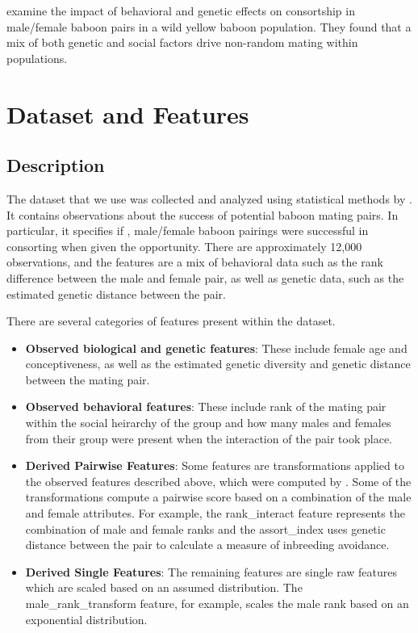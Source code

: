 \documentclass[twoside,twocolumn,paper=letter,fontsize=11pt]{article}
\begin{document}
\cite{Tung:2012} examine the impact of behavioral and genetic effects on
consortship in male/female baboon pairs in a wild yellow baboon population. They
found that a mix of both genetic and social factors drive non-random mating
within populations.

\section{Dataset and Features}
\subsection{Description}
The dataset that we use was collected and analyzed using statistical methods by
\cite{Tung:2012}. It contains observations about the success of potential baboon
mating pairs. In particular, it specifies if , male/female baboon pairings were
successful in consorting when given the opportunity.  There are approximately
12,000 observations, and the features are a mix of behavioral data such as the
rank difference between the male and female pair, as well as genetic data, such
as the estimated genetic distance between the pair. 

There are several categories of features present within the dataset.
\begin{itemize}
  \item{\textbf{Observed biological and genetic features}: These include female age
    and conceptiveness, as well as the estimated genetic diversity and genetic
    distance between the mating pair.}
  \item{\textbf{Observed behavioral features}: These include rank of the mating pair
    within the social heirarchy of the group and how many males and females from
    their group were present when the interaction of the pair took place.}
  \item{\textbf{Derived Pairwise Features}: Some features are
    transformations applied to the observed features described above, which were
    computed by \cite{Tung:2012}. Some of the transformations compute a pairwise
    score based on a combination of the male and female attributes. For example,
    the rank\_interact feature represents the combination of male and female
    ranks and the assort\_index uses genetic distance between the pair to
    calculate a measure of inbreeding avoidance.
    }
  \item{\textbf{Derived Single Features}: The remaining features are single
    raw features which are scaled based on an assumed distribution.  The
    male\_rank\_transform feature, for example, scales the male rank based on an
    exponential distribution.}
\end{itemize}
\end{document}
